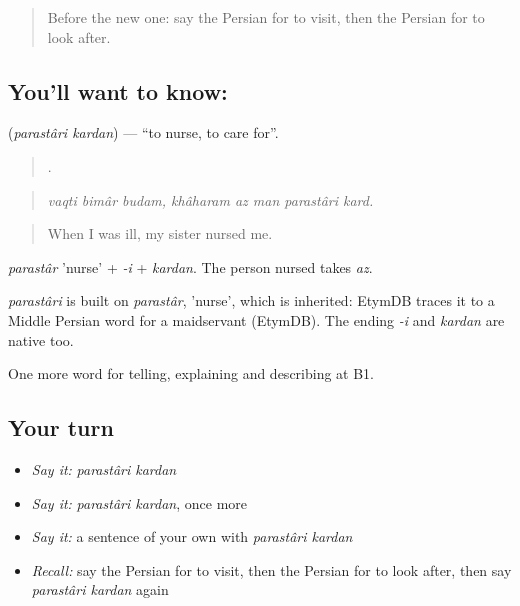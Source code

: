 \label{lesson:FA-C494-parastari-kardan}



\begin{quote}
Before the new one: say the Persian for to visit, then the Persian for to look after.
\end{quote}

\subsection*{You'll want to know:  }
\textbf{ } (\emph{parastâri kardan}) — \textquotedblleft{}to nurse, to care for\textquotedblright{}.

\begin{quote}
       .
\end{quote}

\begin{quote}
\emph{vaqti bimâr budam, khâharam az man parastâri kard.}
\end{quote}

\begin{quote}
When I was ill, my sister nursed me.
\end{quote}

\emph{parastâr} 'nurse' + \emph{-i} + \emph{kardan}. The person nursed takes \emph{az}.

\begin{cousinweb}
\emph{parastâri} is built on \emph{parastâr}, 'nurse', which is inherited: EtymDB traces it to a Middle Persian word for a maidservant (EtymDB). The ending \emph{-i} and \emph{kardan} are native too.
\end{cousinweb}

\begin{grammarlens}[title={What you've built}]
One more word for telling, explaining and describing at B1.
\end{grammarlens}

\subsection*{Your turn}
\begin{itemize}
\raggedright
  \item \emph{Say it:} \emph{parastâri kardan}
  \item \emph{Say it:} \emph{parastâri kardan}, once more
  \item \emph{Say it:} a sentence of your own with \emph{parastâri kardan}
  \item \emph{Recall:} say the Persian for to visit, then the Persian for to look after, then say \emph{parastâri kardan} again
\end{itemize}

